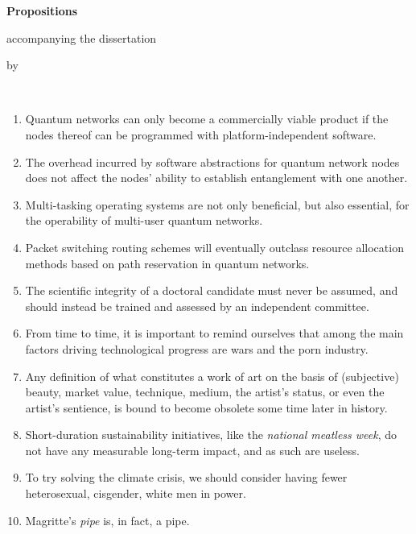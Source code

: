 \begin{center}

{\Large\titlefont\bfseries Propositions}

\medskip

accompanying the dissertation

\medskip

{\makeatletter
\titlestyle\bfseries\large\@title
\makeatother}

{\makeatletter
\ifx\@subtitle\undefined\else
\titlefont\titleshape\@subtitle
\fi
\makeatother}

\medskip

by

\medskip

\makeatletter
{\large\titlefont\bfseries\@firstname\ {\titleshape\@lastname}}
\makeatother

\end{center}

\bigskip

\begin{enumerate}[widest=10]
    \item Quantum networks can only become a commercially viable product if the nodes thereof can be
          programmed with platform-independent software.
    \item The overhead incurred by software abstractions for quantum network nodes does not affect
          the nodes' ability to establish entanglement with one another.
    \item Multi-tasking operating systems are not only beneficial, but also essential, for the
          operability of multi-user quantum networks.
    \item Packet switching routing schemes will eventually outclass resource allocation methods
          based on path reservation in quantum networks.
    \item The scientific integrity of a doctoral candidate must never be assumed, and should
          instead be trained and assessed by an independent committee.
    \item From time to time, it is important to remind ourselves that among the main factors driving
          technological progress are wars and the porn industry.
    \item Any definition of what constitutes a work of art on the basis of (subjective) beauty,
          market value, technique, medium, the artist's status, or even the artist's sentience, is
          bound to become obsolete some time later in history.
    \item Short-duration sustainability initiatives, like the \emph{national meatless week}, do not
          have any measurable long-term impact, and as such are useless.
    \item To try solving the climate crisis, we should consider having fewer heterosexual,
          cisgender, white men in power.
    \item Magritte's \emph{pipe} is, in fact, a pipe.
\end{enumerate}

